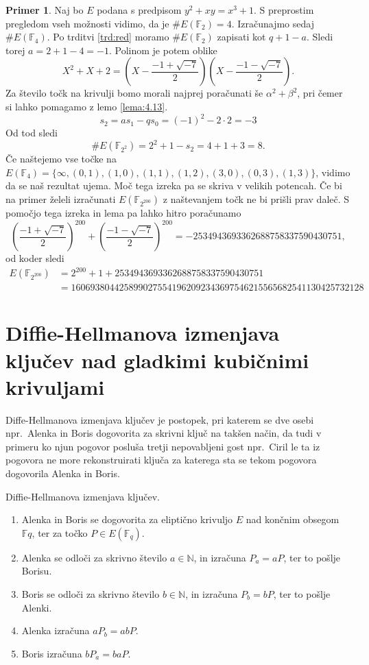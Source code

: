 \documentclass[12pt,a4paper,twoside]{article}
\theoremstyle{definition} %
\newtheorem{primer}[definicija]{Primer}
\theoremstyle{plain} %
\numberwithin{equation}{section}  %
\newcommand{\N}{\mathbb N}
\newcommand{\F}{\mathbb F}
\newcommand{\Fq}[1]{{\mathbb{F}_{#1}}}
\newcommand{\E}[1]{E({#1})}
\begin{document}
\begin{primer}
Naj bo $E$ podana s predpisom $y^2+xy = x^3+1$. S preprostim pregledom vseh možnosti vidimo, da je $\#\E{\F_2} = 4$. Izračunajmo sedaj $\#\E{\F_4}$. Po trditvi \ref{trd:red} moramo
$\#\E{\F_2}$ zapisati kot $q+1-a$. Sledi torej $a = 2+1-4 = -1$. Polinom je potem oblike
$$X^2+X+2 = (X-\frac{-1+\sqrt{-7}}{2}) (X-\frac{-1-\sqrt{-7}}{2}).$$
Za število točk na krivulji bomo morali najprej poračunati še $\alpha^2+\beta^2$, pri čemer si lahko pomagamo z lemo \ref{lema:4.13}.
$$s_2 = as_1-qs_0 = (-1)^2-2\cdot2 = -3$$
Od tod sledi
$$\#\E{\F_{2^2}} = 2^2+1-s_2 = 4+1+3 = 8.$$
 Če naštejemo vse točke na $\E{\F_{4}} = \{ \infty,(0,1),(1,0),(1,1),(1,2),(3,0),(0,3),(1,3)\}$, vidimo da se naš rezultat ujema.
Moč tega izreka pa se skriva v velikih potencah. Če bi na primer želeli izračunati
$\E{\F_{2^{200}}}$ z naštevanjem točk ne bi prišli prav daleč. S pomočjo tega izreka in lema pa lahko hitro poračunamo
$$(\frac{-1+\sqrt{-7}}{2})^{200}+ (\frac{-1-\sqrt{-7}}{2})^{200} = -2534943693362688758337590430751,$$
od koder sledi
\begin{align}
\E{\F_{2^{200}}} &{}= 2^{200} + 1 +2534943693362688758337590430751 \nonumber \\
&{}= 1606938044258990275541962092343697546215565682541130425732128 \nonumber
\end{align}
\end{primer}



\section{Diffie-Hellmanova izmenjava ključev nad gladkimi kubičnimi krivuljami}

Diffe-Hellmanova izmenjava ključev je postopek, pri katerem se dve osebi npr.\  Alenka in Boris dogovorita za skrivni ključ na takšen način, da tudi v primeru ko njun pogovor posluša tretji nepovabljeni gost npr.\  Ciril le ta iz pogovora ne more rekonstruirati ključa za katerega sta se tekom pogovora dogovorila Alenka in Boris. 
\begin{algorithm}[H]
\caption[Diffe-Hellman]{Diffie-Hellmanova izmenjava ključev.}
\label{alg:diffie-hellman}

\begin{enumerate}

\item Alenka in Boris se dogovorita za eliptično krivuljo $E$ nad končnim obsegom $\F{q}$, ter za točko $P \in \E{\Fq{q}}$.
\item Alenka se odloči za skrivno število $a \in \N$, in izračuna $P_a = aP$, ter to pošlje Borisu.
\item Boris se odloči za skrivno število $b \in \N$, in izračuna $P_b = bP$, ter to pošlje Alenki.
\item Alenka izračuna $aP_b=abP$.
\item Boris izračuna $bP_a=baP$.

\end{enumerate}
\end{algorithm}
\end{document}
